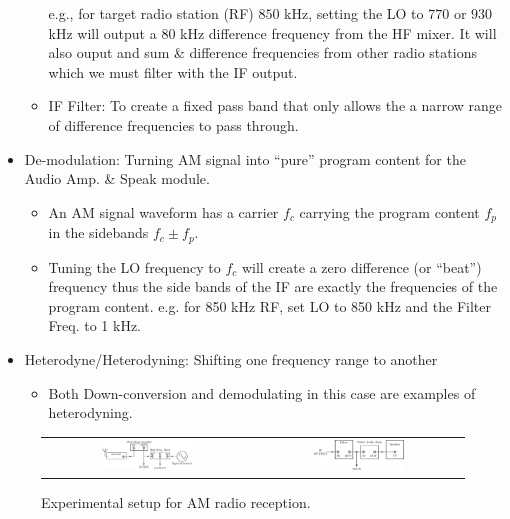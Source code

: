 \documentclass[../main.tex]{subfiles}
\begin{document}
\begin{itemize}
\begin{itemize}
        e.g., for target radio station (RF) $850$ kHz, setting the LO to $770$ or $930$ kHz will output a $80$ kHz difference frequency from the HF mixer. It will also ouput and sum \& difference frequencies from other radio stations which we must filter with the IF output.
        \item IF Filter: To create a fixed pass band that only allows the a narrow range of difference frequencies to pass through.
    \end{itemize}
    \item De-modulation: Turning AM signal into ``pure'' program content for the Audio Amp. \& Speak module.
    \begin{itemize}
        \item An AM signal waveform has a carrier $f_c$ carrying the program content $f_p$ in the sidebands $f_c \pm f_p$. 
        \item Tuning the LO frequency to $f_c$ will create a zero difference (or ``beat'') frequency thus the side bands of the IF are exactly the frequencies of the program content.
        e.g. for 850 kHz RF, set LO to 850 kHz and the Filter Freq. to 1 kHz. 
    \end{itemize}
    \item Heterodyne/Heterodyning: Shifting one frequency range to another
    \begin{itemize}
        \item Both Down-conversion and demodulating in this case are examples of heterodyning.
    \end{itemize}
\end{itemize}

\begin{figure}[ht]
    \centering
    \begin{tabular}{cc}
        \includegraphics[width=0.45\textwidth]{exp2_1.png} & \includegraphics[width=0.45\textwidth]{exp2_2.png}
    \end{tabular}
    \captionsetup{width=0.8\textwidth}
    \caption{Experimental setup for AM radio reception.}
    \label{fig:6}
\end{figure}
\end{document}
